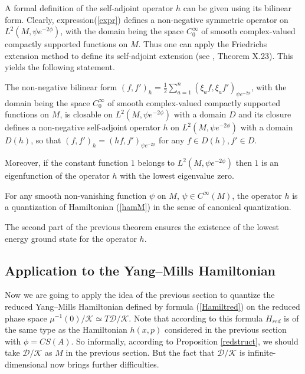 \documentclass{amsart}
\begin{document}
A formal definition of the self-adjoint operator $h$ can be given using its bilinear form. Clearly, expression(\ref{expr}) defines a non-negative symmetric operator on $L^2(M,\psi e^{-2\phi})$, with the domain being the space $C_0^\infty$ of smooth complex-valued compactly supported functions on $M$. Thus one can apply the Friedrichs extension method to define its self-adjoint extension (see \cite{RS2}, Theorem X.23). This yields the following statement.
\begin{theorem}
The non-negative bilinear form $(f,f')_h=\frac 12\sum_{a=1}^n(\xi_af,\xi_a f')_{\psi e^{-2\phi}}$, with the domain being the space $C_0^\infty$ of smooth complex-valued compactly supported functions on $M$, is closable on $L^2(M,\psi e^{-2\phi})$ with a domain $D$ and its closure defines a non-negative self-adjoint operator $h$ on $L^2(M,\psi e^{-2\phi})$ with a domain $D(h)$, so that $(f,f')_h=(hf,f')_{\psi e^{-2\phi}}$ for any $f\in D(h), f'\in D$.
 
Moreover, if the constant function $1$ belongs to $L^2(M,\psi e^{-2\phi})$ then $1$ is an eigenfunction of the operator $h$ with the lowest eigenvalue zero.

For any smooth non-vanishing function $\psi$ on $M$, $\psi\in C^\infty(M)$, the operator $h$ is a quantization of Hamiltonian (\ref{hamM}) in the sense of canonical quantization. 
\end{theorem}

The second part of the previous theorem ensures the existence of the lowest energy ground state for the operator $h$.


\subsection{Application to the Yang--Mills Hamiltonian}\label{YMhamquant}


Now we are going to apply the idea of the previous section to quantize the reduced Yang--Mills Hamiltonian defined by formula (\ref{Hamiltred}) on the reduced phase space $\mu^{-1}(0)/\mathcal{K}\simeq T\mathcal{D}/\mathcal{K}$. Note that according to  this formula $H_{red}$ is of the same type as the Hamiltonian $h(x,p)$ considered in the previous section with $\phi=CS(A)$. So informally, according to Proposition \ref{redstruct}, we should take $\mathcal{D}/\mathcal{K}$ as $M$ in the previous section. But the fact that $\mathcal{D}/\mathcal{K}$ is infinite-dimensional now brings further difficulties.
\end{document}
